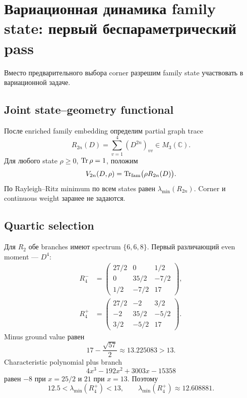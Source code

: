 \chapter{Вариационная динамика family state: первый беспараметрический pass}

Вместо предварительного выбора corner разрешим family state участвовать в
вариационной задаче.

\section{Joint state--geometry functional}

После enriched family embedding определим partial graph trace
\begin{equation}
 R_{2n}(D)=\sum_{v=1}^{4}(D^{2n})_{vv}\in M_3(\mathbb C).
\end{equation}
Для любого state \(\rho\ge0\), \(\operatorname{Tr}\rho=1\), положим
\begin{equation}
 V_{2n}(D,\rho)=\operatorname{Tr}_{\rm fam}\bigl(\rho R_{2n}(D)\bigr).
\end{equation}
По Rayleigh--Ritz minimum по всем states равен
\(\lambda_{\min}(R_{2n})\). Corner и continuous weight заранее не задаются.

\section{Quartic selection}

Для \(R_2\) обе branches имеют spectrum \(\{6,6,8\}\). Первый различающий
even moment --- \(D^4\):
\begin{align}
 R_4^-&=
 \begin{pmatrix}
 27/2&0&1/2\\
 0&35/2&-7/2\\
 1/2&-7/2&17
 \end{pmatrix},\\
 R_4^+&=
 \begin{pmatrix}
 27/2&-2&3/2\\
 -2&35/2&-5/2\\
 3/2&-5/2&17
 \end{pmatrix}.
\end{align}
Minus ground value равен
\begin{equation}
 17-\frac{\sqrt{57}}2\approx13.225083>13.
\end{equation}
Characteristic polynomial plus branch
\begin{equation}
 4x^3-192x^2+3003x-15358
\end{equation}
равен \(-8\) при \(x=25/2\) и \(21\) при \(x=13\). Поэтому
\begin{equation}
 12.5<\lambda_{\min}(R_4^+)<13,
 \qquad
 \lambda_{\min}(R_4^+)\approx12.608881.
\end{equation}

